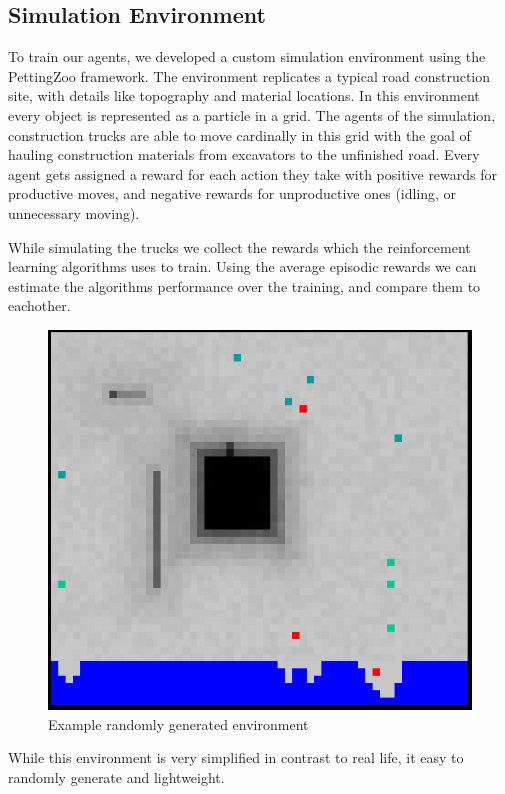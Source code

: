 \documentclass[conference]{IEEEtran}
\begin{document}
	\subsection{Simulation Environment}
	To train our agents, we developed a custom simulation environment using the PettingZoo framework. The environment replicates a typical road construction site, with details like topography and material locations. In this environment every object is represented as a particle in a grid.
	The agents of the simulation, construction trucks are able to move cardinally in this grid with the goal of hauling construction materials from excavators to the unfinished road.
	Every agent gets assigned a reward for each action they take with positive rewards for productive moves, and negative rewards for unproductive ones (idling, or unnecessary moving).

	While simulating the trucks we collect the rewards which the reinforcement learning algorithms uses to train.
	Using the average episodic rewards we can estimate the algorithms performance over the training, and compare them to eachother.
	\begin{figure}[h!]
		\includegraphics[width=0.9\columnwidth]{graphs/example_env.png}
		\caption{Example randomly generated environment}
	\end{figure}
	While this environment is very simplified in contrast to real life, it easy to randomly generate and lightweight.
\end{document}
